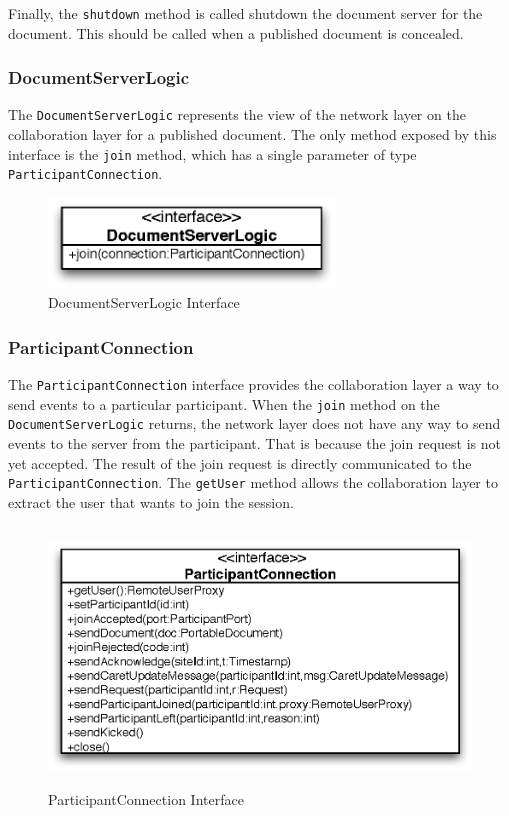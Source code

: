 Finally, the \texttt{shutdown} method is called shutdown the document
server for the document. This should be called when a published document
is concealed.

\subsubsection{DocumentServerLogic}
\label{sect:archoverview.net.documentserverlogic}
The \texttt{DocumentServerLogic} represents the view of the network layer
on the collaboration layer for a published document. The only method
exposed by this interface is the \texttt{join} method, which has a single
parameter of type \texttt{ParticipantConnection}.

\begin{figure}[H]
 \centering
 \includegraphics[width=7.62cm,height=2.40cm]{../images/finalreport/architecture_documentserverlogic_uml.eps}
 \caption{DocumentServerLogic Interface}
\end{figure}

\subsubsection{ParticipantConnection}
The \texttt{ParticipantConnection} interface provides the collaboration layer
a way to send events to a particular participant. When the \texttt{join}
method on the \texttt{DocumentServerLogic} returns, the network layer does
not have any way to send events to the server from the participant. That
is because the join request is not yet accepted. The result of the join
request is directly communicated to the \texttt{ParticipantConnection}.
The \texttt{getUser} method allows the collaboration layer to extract the
user that wants to join the session.

\begin{figure}[H]
 \centering
 \includegraphics[width=12.59cm,height=6.84cm]{../images/finalreport/architecture_participantconnection_uml.eps}
 \caption{ParticipantConnection Interface}
\end{figure}

